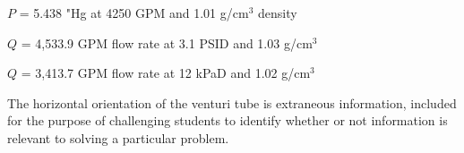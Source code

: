 $P$ = 5.438 "Hg at 4250 GPM and 1.01 g/cm$^{3}$ density

\vskip 10pt

$Q$ = 4,533.9 GPM flow rate at 3.1 PSID and 1.03 g/cm$^{3}$

\vskip 10pt

$Q$ = 3,413.7 GPM flow rate at 12 kPaD and 1.02 g/cm$^{3}$

\vskip 10pt

The horizontal orientation of the venturi tube is extraneous information, included for the purpose of challenging students to identify whether or not information is relevant to solving a particular problem.




